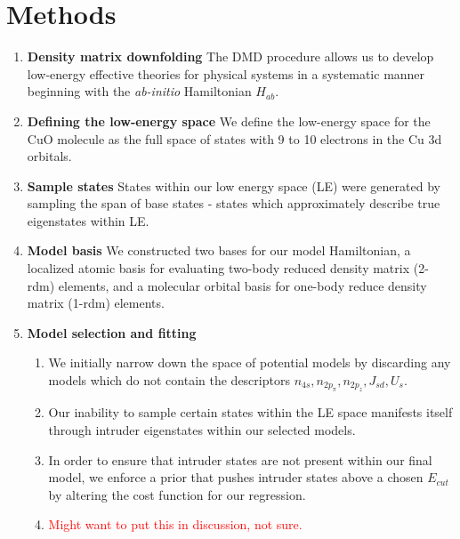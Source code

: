 \documentclass{article}
\begin{document}
\section{Methods}
\begin{enumerate}
\item \textbf{Density matrix downfolding} The DMD procedure allows us to develop low-energy effective theories for physical systems in a systematic manner beginning with the \textit{ab-initio} Hamiltonian $H_{ab}$.

\item \textbf{Defining the low-energy space} We define the low-energy space for the CuO molecule as the full space of states with 9 to 10 electrons in the Cu 3d orbitals.

\item \textbf{Sample states} States within our low energy space (LE) were generated by sampling the span of base states - states which approximately describe true eigenstates within LE.

\item \textbf{Model basis} We constructed two bases for our model Hamiltonian, a localized atomic basis for evaluating two-body reduced density matrix (2-rdm) elements, and a molecular orbital basis for one-body reduce density matrix (1-rdm) elements.

\item \textbf{Model selection and fitting}
\begin{enumerate}
\item We initially narrow down the space of potential models by discarding any models which do not contain the descriptors $n_{4s}, n_{2p_\pi}, n_{2p_z}, J_{sd}, U_s$.

\item Our inability to sample certain states within the LE space manifests itself through intruder eigenstates within our selected models.

\item In order to ensure that intruder states are not present within our final model, we enforce a prior that pushes intruder states above a chosen $E_{cut}$ by altering the cost function for our regression. 

\item \textcolor{red}{Might want to put this in discussion, not sure.}
\end{enumerate}
\end{enumerate}
\end{document}
